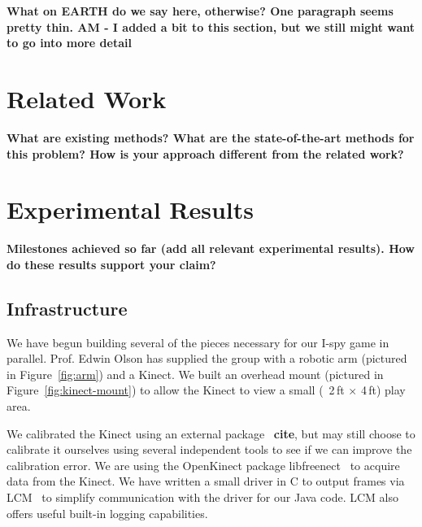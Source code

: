 \documentclass[11pt]{article}
\newcommand{\xxx}[1]{{\bf \color{red} #1}}
\begin{document}
\xxx{What on EARTH do we say here, otherwise? One paragraph seems pretty
    thin. AM - I added a bit to this section, but we still might want to go into more detail}

\section{Related Work}
\xxx{What are existing methods? What are the state-of-the-art methods for this
    problem? How is your approach different from the related work?}

\section{Experimental Results}
\xxx{Milestones achieved so far (add all relevant experimental results). How
    do these results support your claim?}
\subsection{Infrastructure}
We have begun building several of the pieces necessary for our I-spy
game in parallel.  Prof. Edwin Olson has supplied the group with a robotic
arm (pictured in Figure~\ref{fig:arm}) and a Kinect.  We built an
overhead mount (pictured in Figure~\ref{fig:kinect-mount}) to allow the Kinect
to view a small (~2\,ft $\times$ 4\,ft) play area.

We calibrated the Kinect using an external package~\xxx{cite}, but may still
choose to calibrate it ourselves using several independent tools to see if we
can improve the calibration error. We are using the OpenKinect
package libfreenect~\cite{OpenKinect} to acquire data from the Kinect.  We have
written a small driver in C to output frames via LCM~\cite{huang2010} to simplify
communication with the driver for our Java code.  LCM also offers useful
built-in logging capabilities.
\end{document}
